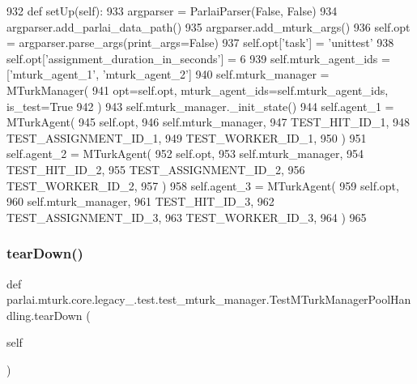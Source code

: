 \begin{DoxyCode}
932     \textcolor{keyword}{def }setUp(self):
933         argparser = ParlaiParser(\textcolor{keyword}{False}, \textcolor{keyword}{False})
934         argparser.add\_parlai\_data\_path()
935         argparser.add\_mturk\_args()
936         self.opt = argparser.parse\_args(print\_args=\textcolor{keyword}{False})
937         self.opt[\textcolor{stringliteral}{'task'}] = \textcolor{stringliteral}{'unittest'}
938         self.opt[\textcolor{stringliteral}{'assignment\_duration\_in\_seconds'}] = 6
939         self.mturk\_agent\_ids = [\textcolor{stringliteral}{'mturk\_agent\_1'}, \textcolor{stringliteral}{'mturk\_agent\_2'}]
940         self.mturk\_manager = MTurkManager(
941             opt=self.opt, mturk\_agent\_ids=self.mturk\_agent\_ids, is\_test=\textcolor{keyword}{True}
942         )
943         self.mturk\_manager.\_init\_state()
944         self.agent\_1 = MTurkAgent(
945             self.opt,
946             self.mturk\_manager,
947             TEST\_HIT\_ID\_1,
948             TEST\_ASSIGNMENT\_ID\_1,
949             TEST\_WORKER\_ID\_1,
950         )
951         self.agent\_2 = MTurkAgent(
952             self.opt,
953             self.mturk\_manager,
954             TEST\_HIT\_ID\_2,
955             TEST\_ASSIGNMENT\_ID\_2,
956             TEST\_WORKER\_ID\_2,
957         )
958         self.agent\_3 = MTurkAgent(
959             self.opt,
960             self.mturk\_manager,
961             TEST\_HIT\_ID\_3,
962             TEST\_ASSIGNMENT\_ID\_3,
963             TEST\_WORKER\_ID\_3,
964         )
965 
\end{DoxyCode}
\mbox{\label{classparlai_1_1mturk_1_1core_1_1legacy__2018_1_1test_1_1test__mturk__manager_1_1TestMTurkManagerPoolHandling_af8eb3ea18a31a150c098fd6c02cc09ae}} 
\subsubsection{\texorpdfstring{tear\+Down()}{tearDown()}}
{\footnotesize\ttfamily def parlai.\+mturk.\+core.\+legacy\+\_.\+test.\+test\+\_\+mturk\+\_\+manager.\+Test\+M\+Turk\+Manager\+Pool\+Handling.\+tear\+Down (\begin{DoxyParamCaption}\item[{}]{self }\end{DoxyParamCaption})}



